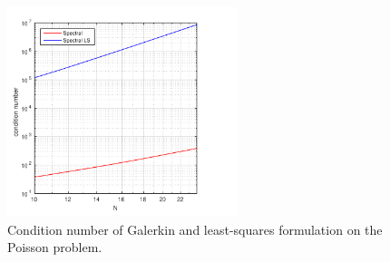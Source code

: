 %
\begin{figure}[ht]
  \centering
	\includegraphics[width=0.6\textwidth]{Figures/condSpec-SpecLS.pdf}
  \caption{Condition number of Galerkin and least-squares formulation on the Poisson problem.}
  \label{fig:ConditionPoisson}
\end{figure}
%

